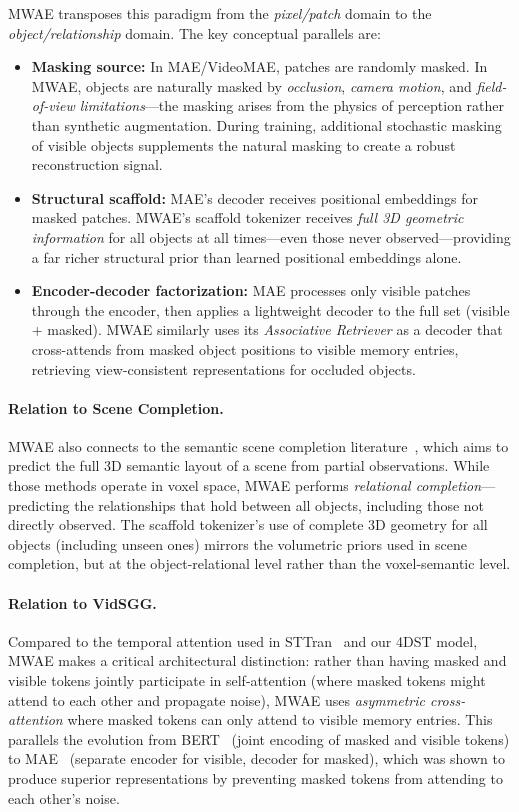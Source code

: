 \documentclass[runningheads]{llncs}
\begin{document}
MWAE transposes this paradigm from the \emph{pixel/patch} domain to the \emph{object/relationship} domain.  The key conceptual parallels are:

\begin{itemize}
    \item \textbf{Masking source:}  In MAE/VideoMAE, patches are randomly masked.  In MWAE, objects are naturally masked by \emph{occlusion}, \emph{camera motion}, and \emph{field-of-view limitations}---the masking arises from the physics of perception rather than synthetic augmentation.  During training, additional stochastic masking of visible objects supplements the natural masking to create a robust reconstruction signal.
    \item \textbf{Structural scaffold:}  MAE's decoder receives positional embeddings for masked patches.  MWAE's scaffold tokenizer receives \emph{full 3D geometric information} for all objects at all times---even those never observed---providing a far richer structural prior than learned positional embeddings alone.
    \item \textbf{Encoder-decoder factorization:}  MAE processes only visible patches through the encoder, then applies a lightweight decoder to the full set (visible + masked).  MWAE similarly uses its \emph{Associative Retriever} as a decoder that cross-attends from masked object positions to visible memory entries, retrieving view-consistent representations for occluded objects.
\end{itemize}

\paragraph{Relation to Scene Completion.}  MWAE also connects to the semantic scene completion literature~\cite{song2017semantic,li2020anisotropic}, which aims to predict the full 3D semantic layout of a scene from partial observations.  While those methods operate in voxel space, MWAE performs \emph{relational completion}---predicting the relationships that hold between all objects, including those not directly observed.  The scaffold tokenizer's use of complete 3D geometry for all objects (including unseen ones) mirrors the volumetric priors used in scene completion, but at the object-relational level rather than the voxel-semantic level.

\paragraph{Relation to VidSGG.}  Compared to the temporal attention used in STTran~\cite{cong2021spatial} and our 4DST model, MWAE makes a critical architectural distinction: rather than having masked and visible tokens jointly participate in self-attention (where masked tokens might attend to each other and propagate noise), MWAE uses \emph{asymmetric cross-attention} where masked tokens can only attend to visible memory entries.  This parallels the evolution from BERT~\cite{devlin2019bert} (joint encoding of masked and visible tokens) to MAE~\cite{he2022masked} (separate encoder for visible, decoder for masked), which was shown to produce superior representations by preventing masked tokens from attending to each other's noise.
\end{document}

